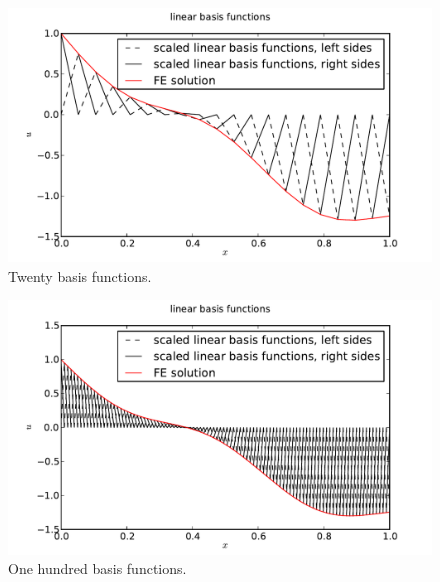\documentclass[10pt]{article}
\begin{document}
\begin{figure}[ht]
    \centering
    \includegraphics[width=\columnwidth,keepaspectratio=true]{./hw7-basis_functions-N20.pdf}
    \caption{Twenty basis functions.}
    \label{fig:N20}
\end{figure}

\begin{figure}[ht]
    \centering
    \includegraphics[width=\columnwidth,keepaspectratio=true]{./hw7-basis_functions-N100.pdf}
    \caption{One hundred basis functions.}
    \label{fig:N100}
\end{figure}
\end{document}
